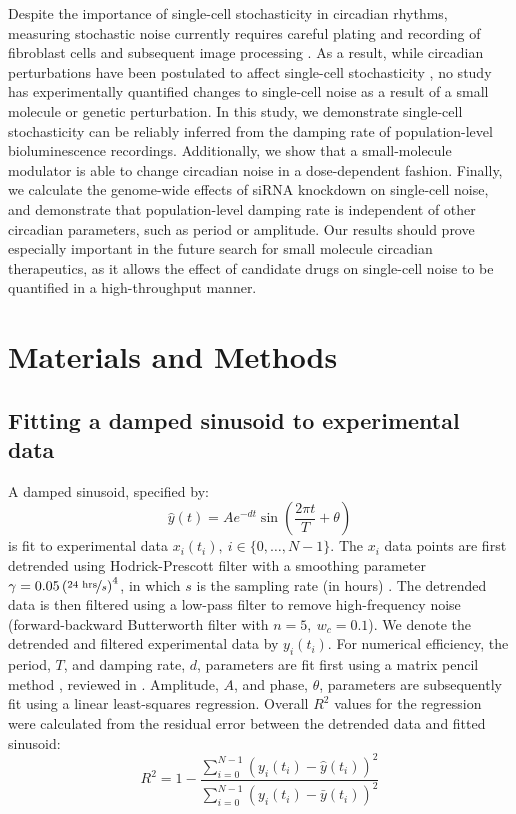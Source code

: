 \documentclass[11pt, letterpaper]{article}
\begin{document}
Despite the importance of single-cell stochasticity in circadian rhythms, measuring stochastic noise currently requires careful plating and recording of fibroblast cells and subsequent image processing \cite{Leise2012}. 
As a result, while circadian perturbations have been postulated to affect single-cell stochasticity \cite{Rougemont2007}, no study has experimentally quantified changes to single-cell noise as a result of a small molecule or genetic perturbation.
In this study, we demonstrate single-cell stochasticity can be reliably inferred from the damping rate of population-level bioluminescence recordings.
Additionally, we show that a small-molecule modulator is able to change circadian noise in a dose-dependent fashion. 
Finally, we calculate the genome-wide effects of siRNA knockdown on single-cell noise, and demonstrate that population-level damping rate is independent of other circadian parameters, such as period or amplitude.
Our results should prove especially important in the future search for small molecule circadian therapeutics, as it allows the effect of candidate drugs on single-cell noise to be quantified in a high-throughput manner.


\section*{Materials and Methods}

\subsection*{Fitting a damped sinusoid to experimental data}
A damped sinusoid, specified by:
\[
  \hat{y}(t) = A e^{-d t} \sin\left(\frac{2\pi t}{T} + \theta\right)
\]
is fit to experimental data $x_i(t_i), \  i \in \{0, \dots, N-1\}$.
The $x_i$ data points are first detrended using Hodrick-Prescott filter with a smoothing parameter $\gamma = 0.05\left(\nicefrac{24 \text{ hrs}}{s}\right)^4$, in which $s$ is the sampling rate (in hours) \cite{Ravn2002}.
The detrended data is then filtered using a low-pass filter to remove high-frequency noise (forward-backward Butterworth filter with $n = 5,\ w_c = 0.1$).
We denote the detrended and filtered experimental data by $y_i(t_i)$.
For numerical efficiency, the period, $T$, and damping rate, $d$, parameters are fit first using a matrix pencil method \cite{Hua1990}, reviewed in \cite{Zielinski2011}.
Amplitude, $A$, and phase, $\theta$, parameters are subsequently fit using a linear least-squares regression.
Overall $R^2$ values for the regression were calculated from the residual error between the detrended data and fitted sinusoid:
\[
  R^2 = 1 - \frac{\sum_{i = 0}^{N-1} (y_i(t_i) - \hat{y}(t_i))^2}{\sum_{i = 0}^{N-1} (y_i(t_i) - \bar{y}(t_i))^2}
\]
\end{document}
